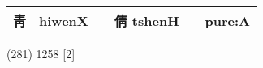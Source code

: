 \documentclass[14pt,a4paper]{scrartcl}
\begin{document}
\begin{longtable}[c]{@{}llllll@{}}
\begin{minipage}[t]{0.14\columnwidth}
靑
\strut\end{minipage} &
\begin{minipage}[t]{0.14\columnwidth}\raggedright\strut
hiwenX
\strut\end{minipage} &
\begin{minipage}[t]{0.14\columnwidth}\raggedright\strut
\strut\end{minipage} &
\begin{minipage}[t]{0.14\columnwidth}\raggedright\strut
倩 tshenH
\strut\end{minipage} &
\begin{minipage}[t]{0.14\columnwidth}\raggedright\strut
\strut\end{minipage} &
\begin{minipage}[t]{0.14\columnwidth}\raggedright\strut
pure:A
\strut\end{minipage}\tabularnewline
\bottomrule
\end{longtable}

(281) 1258 {[}2{]}
\end{document}
